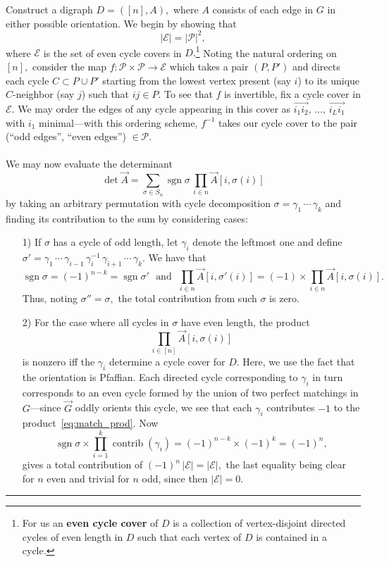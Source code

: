 \documentclass[twoside]{article}
\newenvironment{proof}{{\bf Proof:}}{\hfill\rule{2mm}{2mm}}
\DeclareMathOperator{\sgn}{sgn}
\DeclareMathOperator{\contrib}{contrib}
\begin{document}
\begin{proof}
Construct a digraph $D=([n],A),$ where $A$ consists of each edge in $G$ in either possible orientation. We begin by showing that
\[
|\mathcal{E}| = |\mathcal{P}|^2,
\]
where $\mathcal{E}$ is the set of even cycle covers in $D.$\footnote{For us an \textbf{even cycle cover} of $D$ is a collection of vertex-disjoint directed cycles of even length in $D$ such that each vertex of $D$ is contained in a cycle.} Noting the natural ordering on $[n],$ consider the map $f: \mathcal{P} \times \mathcal{P} \rightarrow \mathcal{E}$ which takes a pair $(P,P')$ and directs each cycle $C\subset P\cup P'$ starting from the lowest vertex present (say $i$) to its unique $C$-neighbor (say $j$) such that $ij \in P.$ To see that $f$ is invertible, fix a cycle cover in $\mathcal{E}.$ We may order the edges of any cycle appearing in this cover as $\overrightarrow{i_1 i_2}, \,  \ldots ,  \, \overrightarrow{i_L i_1} $ with $i_1$ minimal---with this ordering scheme, $f^{-1}$ takes our cycle cover to the pair (``odd edges'', ``even edges'') $\in \mathcal{P}.$\\\\
We may now evaluate the determinant
\[
\det \vec{A} = \displaystyle\sum_{\sigma \in S_n} \sgn  \sigma \, \displaystyle\prod_{i\in n} \vec{A} [i,  \sigma (i)]
\]
by taking an arbitrary permutation with cycle decomposition $\sigma = \gamma_1 \, \cdots \, \gamma_k$ and finding its contribution to the sum by considering cases:
\begin{itemize}
\item[1)] If $\sigma $ has a cycle of odd length, let $\gamma_i$ denote the leftmost one and define $\sigma ' = \gamma_1 \, \cdots \, \gamma_{i-1} \, \gamma_i^{-1} \, \gamma_{i+1} \, \cdots \, \gamma_k.$ We have that
\[
\sgn \sigma = (-1)^{n-k} = \sgn \sigma ' \, \, \text{ and } \, \, \displaystyle\prod_{i\in n} \vec{A} [i,  \sigma ' (i)] = (-1) \times \displaystyle\prod_{i\in n} \vec{A} [i,  \sigma (i)].
\]
Thus, noting $\sigma '' = \sigma ,$ the total contribution from such $\sigma $ is zero.
\item[2)] For the case where all cycles in $\sigma $ have even length, the product 
\[
\prod_{i\in [n]} \vec{A}[i,\sigma (i)] \label{eq:match_prod} \tag{*} 
\]
is nonzero iff the $\gamma_i$ determine a cycle cover for $D.$ Here, we use the fact that the orientation is Pfaffian. Each directed cycle corresponding to $\gamma_i$ in turn corresponds to an even cycle formed by the union of two perfect matchings in $G$---since $\vec{G}$ oddly orients this cycle, we see that each $\gamma_i$ contributes $-1$ to the product~\eqref{eq:match_prod}. Now
\[
\sgn \sigma \times \displaystyle\prod_{i=1}^k \contrib (\gamma_i) = (-1)^{n-k} \times (-1)^k = (-1)^n,
\]
gives a total contribution of $(-1)^n \, |\mathcal{E}| = |\mathcal{E}|,$ the last equality being clear for $n$ even and trivial for $n$ odd, since then $|\mathcal{E}|=0.$
\end{itemize}
\end{proof}
\end{document}
